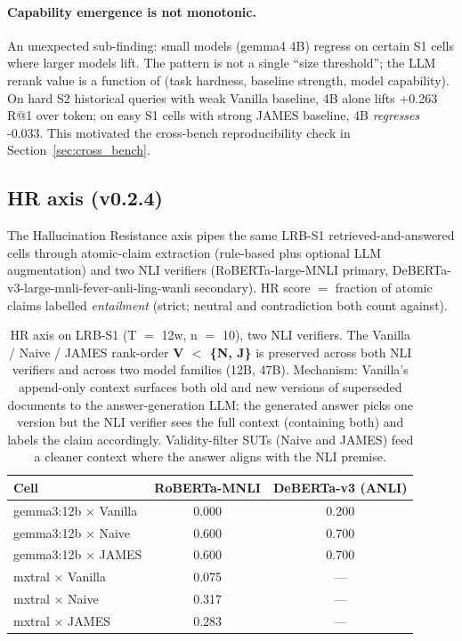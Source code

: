 \documentclass[11pt,a4paper]{article}
\begin{document}
\paragraph{Capability emergence is not monotonic.} An unexpected sub-finding: small models (gemma4 4B) regress on certain S1 cells where larger models lift. The pattern is not a single ``size threshold''; the LLM rerank value is a function of (task hardness, baseline strength, model capability). On hard S2 historical queries with weak Vanilla baseline, 4B alone lifts +0.263 R@1 over token; on easy S1 cells with strong JAMES baseline, 4B \emph{regresses} -0.033. This motivated the cross-bench reproducibility check in Section~\ref{sec:cross_bench}.

\subsection{HR axis (v0.2.4)}
\label{sec:hr_axis}

The Hallucination Resistance axis pipes the same LRB-S1 retrieved-and-answered cells through atomic-claim extraction (rule-based plus optional LLM augmentation) and two NLI verifiers (RoBERTa-large-MNLI primary, DeBERTa-v3-large-mnli-fever-anli-ling-wanli secondary). HR score $=$ fraction of atomic claims labelled \emph{entailment} (strict; neutral and contradiction both count against).

\begin{table}[h]
\centering
\caption{HR axis on LRB-S1 (T $=$ 12w, n $=$ 10), two NLI verifiers. The Vanilla / Naive / JAMES rank-order \textbf{V $<$ \{N, J\}} is preserved across both NLI verifiers and across two model families (12B, 47B). Mechanism: Vanilla's append-only context surfaces both old and new versions of superseded documents to the answer-generation LLM; the generated answer picks one version but the NLI verifier sees the full context (containing both) and labels the claim accordingly. Validity-filter SUTs (Naive and JAMES) feed a cleaner context where the answer aligns with the NLI premise.}
\label{tab:hr_cross_nli}
\begin{tabular}{l c c}
\toprule
\textbf{Cell} & \textbf{RoBERTa-MNLI} & \textbf{DeBERTa-v3 (ANLI)} \\
\midrule
gemma3:12b $\times$ Vanilla & 0.000 & 0.200 \\
gemma3:12b $\times$ Naive & 0.600 & 0.700 \\
gemma3:12b $\times$ JAMES & 0.600 & 0.700 \\
mxtral $\times$ Vanilla & 0.075 & --- \\
mxtral $\times$ Naive & 0.317 & --- \\
mxtral $\times$ JAMES & 0.283 & --- \\
\bottomrule
\end{tabular}
\end{table}
\end{document}

